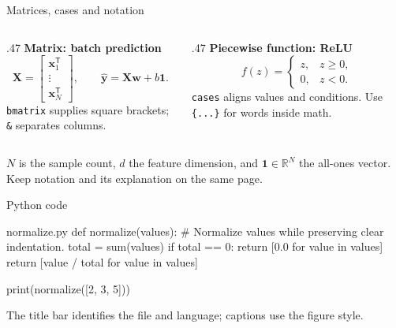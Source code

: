 \begin{frame}{Matrices, cases and notation}
  \begin{columns}[T,onlytextwidth]
    \begin{column}{.47\textwidth}
      \textbf{Matrix: batch prediction}
      \[
        \mathbf{X}=\begin{bmatrix}
          \mathbf{x}_1^{\mathsf T}\\ \vdots\\ \mathbf{x}_N^{\mathsf T}
        \end{bmatrix},\qquad
        \widehat{\mathbf{y}}=\mathbf{X}\mathbf{w}+b\mathbf{1}.
      \]
      \texttt{bmatrix} supplies square brackets; \texttt{\&} separates columns.
    \end{column}
    \begin{column}{.47\textwidth}
      \textbf{Piecewise function: ReLU}
      \[
        f(z)=\begin{cases}z, & z\geq 0,\\ 0, & z<0.\end{cases}
      \]
      \texttt{cases} aligns values and conditions. Use \texttt{\string\text\{...\}} for words inside math.
    \end{column}
  \end{columns}
  \medskip
  \begin{tipbox}
    $N$ is the sample count, $d$ the feature dimension, and $\mathbf{1}\in\mathbb{R}^{N}$ the all-ones vector.
    Keep notation and its explanation on the same page.
  \end{tipbox}
\end{frame}

\begin{frame}[fragile]{Python code}
\begin{campuscode}[language=Python,numbers,caption={Indentation makes the function structure clear.}]{normalize.py}
def normalize(values):
    # Normalize values while preserving clear indentation.
    total = sum(values)
    if total == 0:
        return [0.0 for value in values]
    return [value / total for value in values]

print(normalize([2, 3, 5]))
\end{campuscode}
\small The title bar identifies the file and language; captions use the figure style.
\end{frame}


